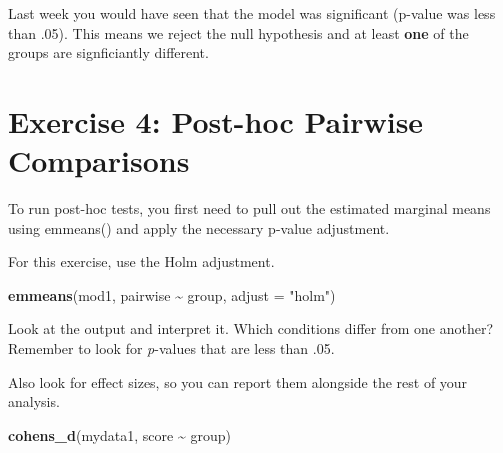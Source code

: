 \documentclass[
]{book}
\newenvironment{Shaded}{\begin{snugshade}}{\end{snugshade}}
\newcommand{\AttributeTok}[1]{\textcolor[rgb]{0.13,0.29,0.53}{#1}}
\newcommand{\ConstantTok}[1]{\textcolor[rgb]{0.56,0.35,0.01}{#1}}
\newcommand{\DecValTok}[1]{\textcolor[rgb]{0.00,0.00,0.81}{#1}}
\newcommand{\FunctionTok}[1]{\textcolor[rgb]{0.13,0.29,0.53}{\textbf{#1}}}
\newcommand{\NormalTok}[1]{#1}
\newcommand{\OtherTok}[1]{\textcolor[rgb]{0.56,0.35,0.01}{#1}}
\newcommand{\SpecialCharTok}[1]{\textcolor[rgb]{0.81,0.36,0.00}{\textbf{#1}}}
\newcommand{\StringTok}[1]{\textcolor[rgb]{0.31,0.60,0.02}{#1}}
\let\oldsection\section
\renewcommand{\section}{\needspace{5\baselineskip}\oldsection}
\begin{document}
\begin{Shaded}
\end{Shaded}

Last week you would have seen that the model was significant (p-value was less than .05). This means we reject the null hypothesis and at least \textbf{one} of the groups are signficiantly different.

\section{Exercise 4: Post-hoc Pairwise Comparisons}\label{exercise-4-post-hoc-pairwise-comparisons}

To run post-hoc tests, you first need to pull out the estimated marginal means using emmeans() and apply the necessary p-value adjustment.

For this exercise, use the Holm adjustment.

\begin{Shaded}
\begin{Highlighting}[]
\FunctionTok{emmeans}\NormalTok{(mod1,}
\NormalTok{        pairwise }\SpecialCharTok{\textasciitilde{}}\NormalTok{ group,}
        \AttributeTok{adjust =} \StringTok{"holm"}\NormalTok{)}
\end{Highlighting}
\end{Shaded}

Look at the output and interpret it. Which conditions differ from one another? Remember to look for \emph{p}-values that are less than .05.

Also look for effect sizes, so you can report them alongside the rest of your analysis.

\begin{Shaded}
\begin{Highlighting}[]
\FunctionTok{cohens\_d}\NormalTok{(mydata1, score }\SpecialCharTok{\textasciitilde{}}\NormalTok{ group)}
\end{Highlighting}
\end{Shaded}
\end{document}
